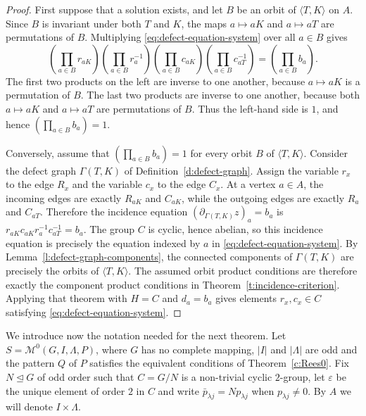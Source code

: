 \documentclass[11pt]{article}
\theoremstyle{plain}
\theoremstyle{remark}
\theoremstyle{definition}
\theoremstyle{plain}
\begin{document}
\begin{proof}
First suppose that a solution exists, and let $B$ be an orbit of
$\langle T,K\rangle$ on $A$. Since $B$ is invariant under both $T$ and $K$, the
maps $a\mapsto aK$ and $a\mapsto aT$ are permutations of $B$. Multiplying
\eqref{eq:defect-equation-system} over all $a\in B$ gives
\[
        \left(\prod_{a\in B} r_{aK}\right)
        \left(\prod_{a\in B} r_a^{-1}\right)
        \left(\prod_{a\in B} c_{aK}\right)
        \left(\prod_{a\in B} c_{aT}^{-1}\right)
        =
        \left(\prod_{a\in B} b_a\right).
\]
The first two products on the left are inverse to one another, because
$a\mapsto aK$ is a permutation of $B$. The last two products are inverse to one
another, because both $a\mapsto aK$ and $a\mapsto aT$ are permutations of $B$.
Thus the left-hand side is $1$, and hence $\left(\prod_{a\in B}b_a\right)=1$.

Conversely, assume that $\left(\prod_{a\in B}b_a\right)=1$ for every orbit $B$ of
$\langle T,K\rangle$. Consider the defect graph $\Gamma(T,K)$ of
Definition~\ref{d:defect-graph}. Assign the variable $r_x$ to the edge $R_x$
and the variable $c_x$ to the edge $C_x$. At a vertex $a\in A$, the incoming
edges are exactly $R_{aK}$ and $C_{aK}$, while the outgoing edges are exactly
$R_a$ and $C_{aT}$. Therefore the incidence equation
$(\partial_{\Gamma(T,K)}z)_a=b_a$ is
\(r_{aK}c_{aK}r_a^{-1}c_{aT}^{-1}=b_a.\)
The group $C$ is cyclic, hence abelian, so this incidence equation is
precisely the equation indexed by $a$ in \eqref{eq:defect-equation-system}.
By Lemma~\ref{l:defect-graph-components}, the connected components of
$\Gamma(T,K)$ are precisely the orbits of $\langle T,K\rangle$. The assumed
orbit product conditions are therefore exactly the component product conditions
in Theorem~\ref{t:incidence-criterion}. Applying that theorem with $H=C$ and
$d_a=b_a$ gives elements $r_x,c_x\in C$ satisfying
\eqref{eq:defect-equation-system}.
\end{proof}

\begingroup
We introduce now the notation needed for the next theorem. Let
$S=\mathcal M^0(G,I,\Lambda,P)$, where $G$ has no complete mapping, $|I|$
and $|\Lambda|$ are odd and the pattern $Q$ of $P$ satisfies the equivalent
conditions of Theorem~\ref{c:Rees0}. Fix $N\unlhd G$ of odd order such that
$C=G/N$ is a non-trivial cyclic $2$-group, let $\varepsilon$ be the unique
element of order $2$ in $C$ and write $\bar p_{\lambda j}=Np_{\lambda j}$
when $p_{\lambda j}\ne0$. By $A$ we will denote $I\times\Lambda$.
\end{document}
